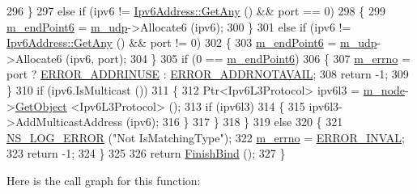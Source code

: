 \begin{DoxyCode}
296         \}
297       \textcolor{keywordflow}{else} \textcolor{keywordflow}{if} (ipv6 != \hyperlink{classns3_1_1Ipv6Address_a2783e8badfc98c8b0a8508bba6e1b91e}{Ipv6Address::GetAny} () && port == 0)
298         \{
299           \hyperlink{classns3_1_1UdpSocketImpl_ad8b59997645c24d4550092d138270652}{m\_endPoint6} = \hyperlink{classns3_1_1UdpSocketImpl_ace4b90c1ab6f4f302cdb4cd8da973514}{m\_udp}->Allocate6 (ipv6);
300         \}
301       \textcolor{keywordflow}{else} \textcolor{keywordflow}{if} (ipv6 != \hyperlink{classns3_1_1Ipv6Address_a2783e8badfc98c8b0a8508bba6e1b91e}{Ipv6Address::GetAny} () && port != 0)
302         \{
303           \hyperlink{classns3_1_1UdpSocketImpl_ad8b59997645c24d4550092d138270652}{m\_endPoint6} = \hyperlink{classns3_1_1UdpSocketImpl_ace4b90c1ab6f4f302cdb4cd8da973514}{m\_udp}->Allocate6 (ipv6, port);
304         \}
305       \textcolor{keywordflow}{if} (0 == \hyperlink{classns3_1_1UdpSocketImpl_ad8b59997645c24d4550092d138270652}{m\_endPoint6})
306         \{
307           \hyperlink{classns3_1_1UdpSocketImpl_ac35998e8aa2cc588e21752944b0a0095}{m\_errno} = port ? \hyperlink{classns3_1_1Socket_ada1328c5ae0c28cb2a982caf8f6d6ccaa5ed359ef348d4ee7d288881b74cca81a}{ERROR\_ADDRINUSE} : 
      \hyperlink{classns3_1_1Socket_ada1328c5ae0c28cb2a982caf8f6d6ccaae6ddc4aa97ebe6f3f71688337c9d3117}{ERROR\_ADDRNOTAVAIL};
308           \textcolor{keywordflow}{return} -1;
309         \}
310       \textcolor{keywordflow}{if} (ipv6.IsMulticast ())
311         \{
312           Ptr<Ipv6L3Protocol> ipv6l3 = \hyperlink{classns3_1_1UdpSocketImpl_af6a19247be3d8917b582af77337730c3}{m\_node}->\hyperlink{classns3_1_1Object_a13e18c00017096c8381eb651d5bd0783}{GetObject} <Ipv6L3Protocol> ();
313           \textcolor{keywordflow}{if} (ipv6l3)
314             \{
315               ipv6l3->AddMulticastAddress (ipv6);
316             \}
317         \}
318     \}
319   \textcolor{keywordflow}{else}
320     \{
321       \hyperlink{group__logging_ga0261a8db1d4ac5f79417d117634fd455}{NS\_LOG\_ERROR} (\textcolor{stringliteral}{"Not IsMatchingType"});
322       \hyperlink{classns3_1_1UdpSocketImpl_ac35998e8aa2cc588e21752944b0a0095}{m\_errno} = \hyperlink{classns3_1_1Socket_ada1328c5ae0c28cb2a982caf8f6d6ccaa4b98dd50740861229f8e03bcc36d379b}{ERROR\_INVAL};
323       \textcolor{keywordflow}{return} -1;
324     \}
325 
326   \textcolor{keywordflow}{return} \hyperlink{classns3_1_1UdpSocketImpl_ab176a2c5ea5e2ba0431a59cbc423c618}{FinishBind} ();
327 \}
\end{DoxyCode}


Here is the call graph for this function\+:


